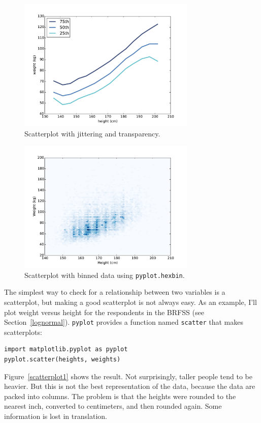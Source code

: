 \documentclass[12pt]{book}
\begin{document}
\begin{figure}
\centerline{\includegraphics[height=2.5in]{figs/scatter3.pdf}}
\caption{Scatterplot with jittering and transparency.}
\label{scatterplot3}
\end{figure}

\begin{figure}
\centerline{\includegraphics[height=2.5in]{figs/scatter4.pdf}}
\caption{Scatterplot with binned data using {\tt pyplot.hexbin}.}
\label{scatterplot4}
\end{figure}

The simplest way to check for a relationship between two variables
is a scatterplot, but making a good scatterplot is not always easy.
As an example, I'll plot weight versus height for the respondents
in the BRFSS (see Section~\ref{lognormal}).  {\tt pyplot} provides
a function named {\tt scatter} that makes scatterplots:
%
\begin{verbatim}
import matplotlib.pyplot as pyplot
pyplot.scatter(heights, weights)
\end{verbatim}

Figure~\ref{scatterplot1} shows the result.  Not surprisingly, taller
people tend to be heavier.  But this is not the best representation of
the data, because the data are packed into columns.  The problem is
that the heights were rounded to the nearest inch, converted to
centimeters, and then rounded again.  Some information is lost in
translation.    
\end{document}
